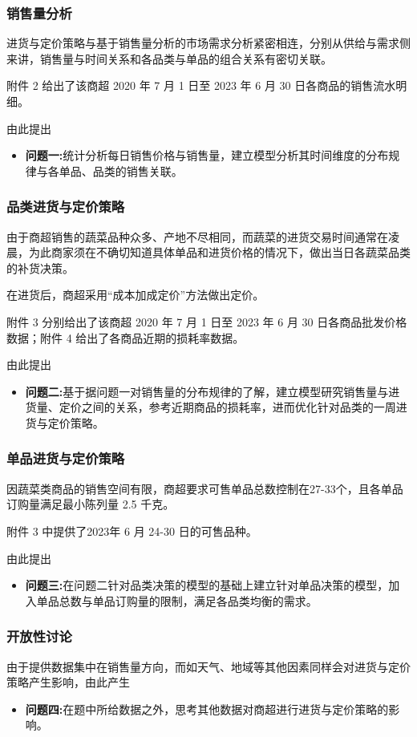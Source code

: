 \documentclass[withoutpreface,bwprint]{cumcmthesis} %
\begin{document}
\subsubsection{销售量分析}
进货与定价策略与基于销售量分析的市场需求分析紧密相连，分别从供给与需求侧来讲，销售量与时间关系和各品类与单品的组合关系有密切关联。
    
附件 2 给出了该商超 2020 年 7 月 1 日至 2023 年 6 月 30 日各商品的销售流水明细。

由此提出
\begin{itemize}
    \item \textbf{问题一:}统计分析每日销售价格与销售量，建立模型分析其时间维度的分布规律与各单品、品类的销售关联。
\end{itemize}

\subsubsection{品类进货与定价策略}
由于商超销售的蔬菜品种众多、产地不尽相同，而蔬菜的进货交易时间通常在凌晨，为此商家须在不确切知道具体单品和进货价格的情况下，做出当日各蔬菜品类的补货决策。

在进货后，商超采用“成本加成定价”方法做出定价。

附件 3 分别给出了该商超 2020 年 7 月 1 日至 2023 年 6 月 30 日各商品批发价格数据；附件 4 给出了各商品近期的损耗率数据。

由此提出
\begin{itemize}
    \item \textbf{问题二:}基于据问题一对销售量的分布规律的了解，建立模型研究销售量与进货量、定价之间的关系，参考近期商品的损耗率，进而优化针对品类的一周进货与定价策略。
\end{itemize}

\subsubsection{单品进货与定价策略}
因蔬菜类商品的销售空间有限，商超要求可售单品总数控制在27-33个，且各单品订购量满足最小陈列量 2.5 千克。

附件 3 中提供了2023年 6 月 24-30 日的可售品种。

由此提出
\begin{itemize}
    \item \textbf{问题三:}在问题二针对品类决策的模型的基础上建立针对单品决策的模型，加入单品总数与单品订购量的限制，满足各品类均衡的需求。
\end{itemize}

\subsubsection{开放性讨论}
由于提供数据集中在销售量方向，而如天气、地域等其他因素同样会对进货与定价策略产生影响，由此产生
\begin{itemize}
    \item \textbf{问题四:}在题中所给数据之外，思考其他数据对商超进行进货与定价策略的影响。
\end{itemize}
\end{document}

